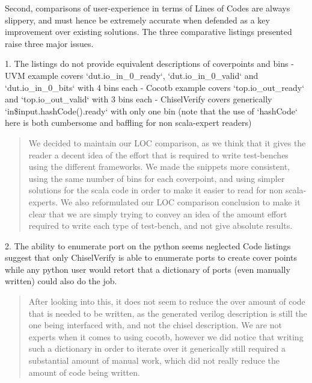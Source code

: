 \documentclass{article}
\newcommand{\todo}[1]{{\color{olive} TODO: #1}}
\newcommand{\martin}[1]{{\color{blue} Martin: #1\\}}
\newcommand{\reply}[1]{{\color{blue} #1}}
\begin{document}
Second, comparisons of user-experience in terms of Lines of Codes are always slippery, and must hence be extremely accurate when defended as a key improvement over existing solutions.
The three comparative listings presented raise three major issues.

1. The listings do not provide equivalent descriptions of coverpoints and bins
- UVM example covers `dut.io\_in\_0\_ready`, `dut.io\_in\_0\_valid` and `dut.io\_in\_0\_bits` with 4 bins each
- Cocotb example covers `top.io\_out\_ready` and `top.io\_out\_valid` with 3 bins each
- ChiselVerify covers generically `in\${input.hashCode()}.ready` with only one bin (note that the use of `hashCode` here is both cumbersome and baffling for non scala-expert readers)

\begin{quote}
\reply{
We decided to maintain our LOC comparison, as we think that it gives the reader a decent idea of the effort that is required to write test-benches using the different frameworks.
We made the snippets more consistent, using the same number of bins for each coverpoint, and using simpler solutions for the scala code in order to make it easier to read for non scala-experts.
We also reformulated our LOC comparison conclusion to make it clear that we are simply trying to convey an idea of the amount effort required to write each type of test-bench, and not give absolute results.
}
\end{quote}


2. The ability to enumerate port on the python seems neglected
Code listings suggest that only ChiselVerify is able to enumerate ports to create cover points while any python user would retort that a dictionary of ports (even manually written) could also do the job.

\begin{quote}
\reply{After looking into this, it does not seem to reduce the over amount of code that is needed to be written, as the generated verilog description is still the one being interfaced with, and not the chisel description.
We are not experts when it comes to using cocotb, however we did notice that writing such a dictionary in order to iterate over it generically still required a substantial amount of manual work, which did not really reduce the amount of code being written.
}
\end{quote}
\end{document}
